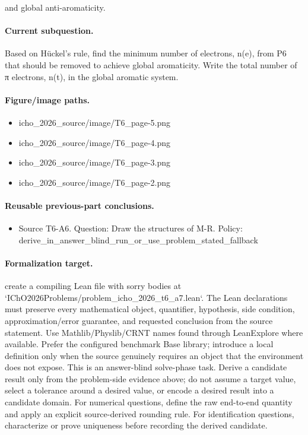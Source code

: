 and global anti-aromaticity.

\paragraph{Current subquestion.}
Based on Hückel’s rule, find the minimum number of electrons, n(e), from P6 that should be removed to achieve global aromaticity. Write the total number of π electrons, n(t), in the global aromatic system.

\paragraph{Figure/image paths.}
\begin{itemize}
\item icho\_2026\_source/image/T6\_page-5.png
\item icho\_2026\_source/image/T6\_page-4.png
\item icho\_2026\_source/image/T6\_page-3.png
\item icho\_2026\_source/image/T6\_page-2.png
\end{itemize}

\paragraph{Reusable previous-part conclusions.}
\begin{itemize}
\item Source T6-A6. Question: Draw the structures of M-R. Policy: derive\_in\_answer\_blind\_run\_or\_use\_problem\_stated\_fallback
\end{itemize}

\paragraph{Formalization target.}
create a compiling Lean file with sorry bodies at `IChO2026Problems/problem\_icho\_2026\_t6\_a7.lean`.
The Lean declarations must preserve every mathematical object, quantifier, hypothesis, side condition, approximation/error guarantee, and requested conclusion from the source statement.
Use Mathlib/Physlib/CRNT names found through LeanExplore where available. Prefer the configured benchmark Base library; introduce a local definition only when the source genuinely requires an object that the environment does not expose.
This is an answer-blind solve-phase task. Derive a candidate result only from the problem-side evidence above; do not assume a target value, select a tolerance around a desired value, or encode a desired result into a candidate domain.
For numerical questions, define the raw end-to-end quantity and apply an explicit source-derived rounding rule. For identification questions, characterize or prove uniqueness before recording the derived candidate.

